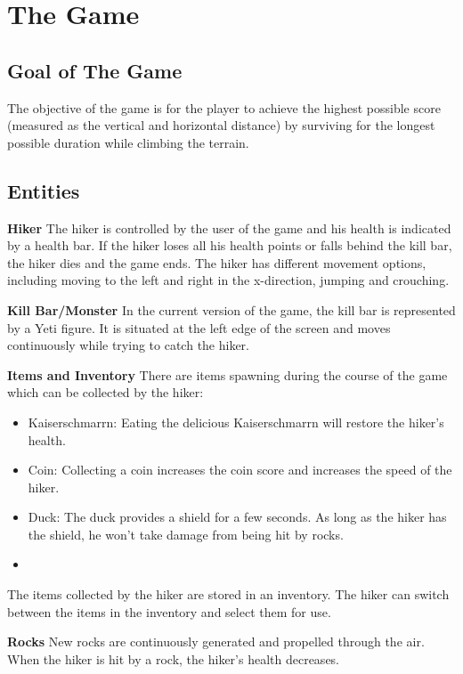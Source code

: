 \section{The Game}

\subsection{Goal of The Game}
The objective of the game is for the player to achieve the highest possible score (measured as the vertical and horizontal distance)
by surviving for the longest possible duration while climbing the terrain.

\subsection{Entities}
\textbf{Hiker}
The hiker is controlled by the user of the game and his health is indicated by a health bar.
If the hiker loses all his health points or falls behind the kill bar, the hiker dies and the game ends.
The hiker has different movement options, including moving to the left and right in the x-direction, jumping and crouching.

\textbf{Kill Bar/Monster}
In the current version of the game, the kill bar is represented by a Yeti figure.
It is situated at the left edge of the screen and moves continuously while trying to catch the hiker.

\textbf{Items and Inventory}
There are items spawning during the course of the game which can be collected by the hiker:

\begin{itemize}
\item Kaiserschmarrn: Eating the delicious Kaiserschmarrn will restore the hiker's health.
\item Coin: Collecting a coin increases the coin score and increases the speed of the hiker.
\item Duck: The duck provides a shield for a few seconds. As long as the hiker has the shield, he won't take damage from being hit by rocks.
\item {}
\end{itemize}

The items collected by the hiker are stored in an inventory.
The hiker can switch between the items in the inventory and select them for use.

\textbf{Rocks}
New rocks are continuously generated and propelled through the air.
When the hiker is hit by a rock, the hiker's health decreases.